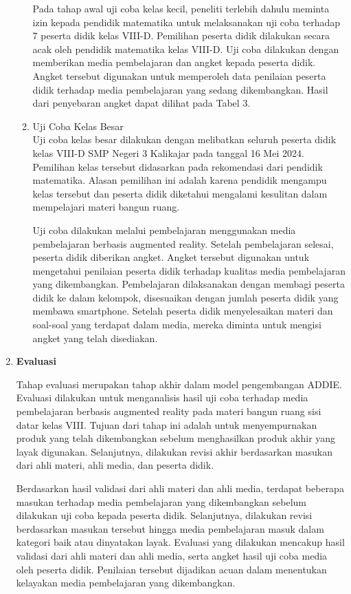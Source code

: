 \documentclass[12pt]{article}
\begin{document}
\begin{enumerate}[leftmargin=1cm, label=\arabic*.]
\begin{enumerate}
        \hspace*{1cm}Pada tahap awal uji coba kelas kecil, peneliti terlebih dahulu meminta izin kepada pendidik matematika untuk melaksanakan uji coba terhadap 7 peserta didik kelas VIII-D. Pemilihan peserta didik dilakukan secara acak oleh pendidik matematika kelas VIII-D. Uji coba dilakukan dengan memberikan media pembelajaran dan angket kepada peserta didik. Angket tersebut digunakan untuk memperoleh data penilaian peserta didik terhadap media pembelajaran yang sedang dikembangkan. Hasil dari penyebaran angket dapat dilihat pada Tabel 3.

        \item Uji Coba Kelas Besar \\
        \hspace*{1cm}Uji coba kelas besar dilakukan dengan melibatkan seluruh peserta didik kelas VIII-D SMP Negeri 3 Kalikajar pada tanggal 16 Mei 2024. Pemilihan kelas tersebut didasarkan pada rekomendasi dari pendidik matematika. Alasan pemilihan ini adalah karena pendidik mengampu kelas tersebut dan peserta didik diketahui mengalami kesulitan dalam mempelajari materi bangun ruang.

        \hspace{1cm}Uji coba dilakukan melalui pembelajaran menggunakan media pembelajaran berbasis augmented reality. Setelah pembelajaran selesai, peserta didik diberikan angket. Angket tersebut digunakan untuk mengetahui penilaian peserta didik terhadap kualitas media pembelajaran yang dikembangkan. Pembelajaran dilaksanakan dengan membagi peserta didik ke dalam kelompok, disesuaikan dengan jumlah peserta didik yang membawa smartphone. Setelah peserta didik menyelesaikan materi dan soal-soal yang terdapat dalam media, mereka diminta untuk mengisi angket yang telah disediakan.
    \end{enumerate}

    \item \textbf{Evaluasi}
    
    \hspace{1cm}Tahap evaluasi merupakan tahap akhir dalam model pengembangan ADDIE. Evaluasi dilakukan untuk menganalisis hasil uji coba terhadap media pembelajaran berbasis augmented reality pada materi bangun ruang sisi datar kelas VIII. Tujuan dari tahap ini adalah untuk menyempurnakan produk yang telah dikembangkan sebelum menghasilkan produk akhir yang layak digunakan. Selanjutnya, dilakukan revisi akhir berdasarkan masukan dari ahli materi, ahli media, dan peserta didik.

    \hspace{1cm}Berdasarkan hasil validasi dari ahli materi dan ahli media, terdapat beberapa masukan terhadap media pembelajaran yang dikembangkan sebelum dilakukan uji coba kepada peserta didik. Selanjutnya, dilakukan revisi berdasarkan masukan tersebut hingga media pembelajaran masuk dalam kategori baik atau dinyatakan layak. Evaluasi yang dilakukan mencakup hasil validasi dari ahli materi dan ahli media, serta angket hasil uji coba media oleh peserta didik. Penilaian tersebut dijadikan acuan dalam menentukan kelayakan media pembelajaran yang dikembangkan.

\end{enumerate}
\end{document}
